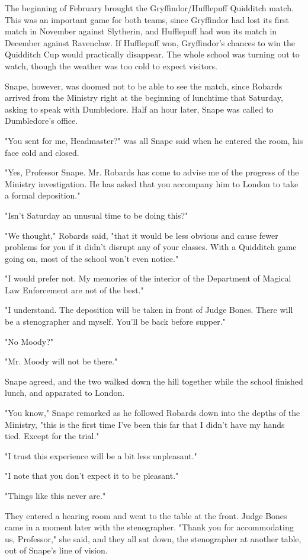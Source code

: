 The beginning of February brought the Gryffindor\slash Hufflepuff Quidditch match. This was an important game for both teams, since Gryffindor had lost its first match in November against Slytherin, and Hufflepuff had won its match in December against Ravenclaw. If Hufflepuff won, Gryffindor's chances to win the Quidditch Cup would practically disappear. The whole school was turning out to watch, though the weather was too cold to expect visitors.

Snape, however, was doomed not to be able to see the match, since Robards arrived from the Ministry right at the beginning of lunchtime that Saturday, asking to speak with Dumbledore. Half an hour later, Snape was called to Dumbledore's office.

"You sent for me, Headmaster?" was all Snape said when he entered the room, his face cold and closed.

"Yes, Professor Snape. Mr. Robards has come to advise me of the progress of the Ministry investigation. He has asked that you accompany him to London to take a formal deposition."

"Isn't Saturday an unusual time to be doing this?"

"We thought," Robards said, "that it would be less obvious and cause fewer problems for you if it didn't disrupt any of your classes. With a Quidditch game going on, most of the school won't even notice."

"I would prefer not. My memories of the interior of the Department of Magical Law Enforcement are not of the best."

"I understand. The deposition will be taken in front of Judge Bones. There will be a stenographer and myself. You'll be back before supper."

"No Moody?"

"Mr. Moody will not be there."

Snape agreed, and the two walked down the hill together while the school finished lunch, and apparated to London.

"You know," Snape remarked as he followed Robards down into the depths of the Ministry, "this is the first time I've been this far that I didn't have my hands tied. Except for the trial."

"I trust this experience will be a bit less unpleasant."

"I note that you don't expect it to be pleasant."

"Things like this never are."

They entered a hearing room and went to the table at the front. Judge Bones came in a moment later with the stenographer. "Thank you for accommodating us, Professor," she said, and they all sat down, the stenographer at another table, out of Snape's line of vision.

